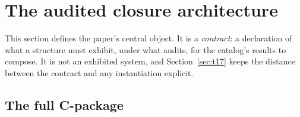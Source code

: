 \section{The audited closure architecture}
\label{sec:arch}

This section defines the paper's central object. It is a \emph{contract}: a
declaration of what a structure must exhibit, under what audits, for the
catalog's results to compose. It is not an exhibited system, and
Section~\ref{sec:t17} keeps the distance between the contract and any
instantiation explicit.

\subsection{The full C-package}
\label{sec:cpackage}

